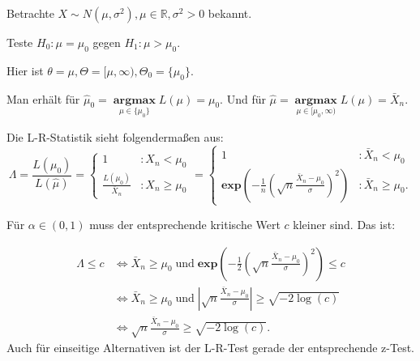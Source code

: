 \documentclass[10pt]{article}
\newcommand{\IR}{\mathbb{R}} %
\newenvironment{BSP}[1][]
{\begin{Beispiel}[frametitle=#1]}{\end{Beispiel}}
\begin{document}
	\begin{BSP}[Beispiel 2.1.2 (z-Test mit einseitiger Alternative)]
		Betrachte $X \sim N(\mu, \sigma^2), \mu \in \IR, \sigma^2 >0$ bekannt.
		
		Teste $H_0: \mu = \mu_0$ gegen $H_1: \mu > \mu_0$.
		
		Hier ist $\theta = \mu, \Theta = [\mu, \infty), \Theta_0 = \{\mu_0\}$.
		
		Man erhält für $\hat{\mu}_0 = \;\underset{\mu \in \{\mu_0\}}{\textbf{argmax}} \; L(\mu) = \mu_0$.
		Und für $\hat{\mu} = \;\underset{\mu \in [\mu_0, \infty)}{\textbf{argmax}} \; L(\mu) = \bar{X}_n$.
		
		Die L-R-Statistik sieht folgendermaßen aus:
		\begin{equation*}
			\Lambda = \frac{L(\mu_0)}{L(\hat{\mu})} = \begin{cases}
				1 &: X_n < \mu_0\\
				\frac{L(\mu_0)}{\bar{X}_n} &: X_n \geq \mu_0
			\end{cases}
			= \begin{cases}
				1 &: \bar{X}_n < \mu_0\\
				\textbf{exp} \left(- \frac{1}{n}\left(\sqrt{n} \frac{\bar{X}_n - \mu_0}{\sigma}\right)^2\right) &: \bar{X}_n \geq \mu_0.
			\end{cases}
		\end{equation*}
		
		Für $\alpha \in (0,1)$ muss der entsprechende kritische Wert $c$ kleiner sind. Das ist:
		
		\begin{equation*}
			\begin{split}
				\Lambda \leq c &\Leftrightarrow \bar{X}_n \geq \mu_0 \; \text{und} \; \textbf{exp}\left(-\frac{1}{2}\left(\sqrt{n} \frac{\bar{X}_n - \mu_0}{\sigma}\right)^2\right) \leq c\\
				&\Leftrightarrow \bar{X}_n \geq \mu_0 \; \text{und} \; \left\vert \sqrt{n} \frac{\bar{X}_n - \mu_0}{\sigma} \right\vert \geq \sqrt{-2 \log(c)} \\
				&\Leftrightarrow \sqrt{n} \frac{\bar{X}_n - \mu_0}{\sigma} \geq \sqrt{-2 \log(c)}.
			\end{split}
		\end{equation*}
		Auch für einseitige Alternativen ist der L-R-Test gerade der entsprechende z-Test. 
	\end{BSP}
	
\end{document}
